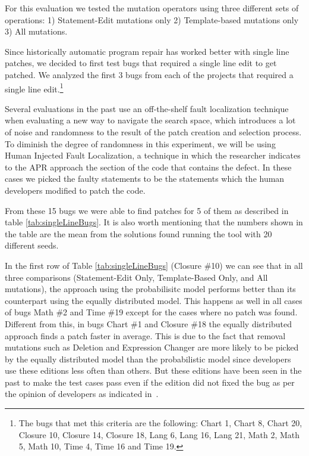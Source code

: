 \documentclass[conference]{IEEEtran}
\begin{document}
For this evaluation we tested the mutation operators using three different sets 
of operations: 1) Statement-Edit mutations only 2) Template-based mutations 
only 3) All mutations.

Since historically automatic program repair has worked better with single line 
patches, we decided to first test bugs that required a single line edit to get 
patched. We analyzed the first 3 bugs from each of the projects that required a 
single line edit.\footnote{The bugs that met this criteria are the following: Chart 1, 
Chart 8, Chart 20, Closure 10, Closure 14, Closure 18, Lang 6, Lang 16, Lang 21, 
Math 2, Math 5, Math 10, Time 4, Time 16 and Time 19.}

Several evaluations in the past use an off-the-shelf fault localization technique when evaluating a new way to navigate the search space, which introduces a lot of noise and randomness to the result of the patch creation and selection process. To diminish the degree of randomness in this experiment, we will be using Human Injected Fault Localization, a technique in which the researcher indicates to the APR approach the section of the code that contains the defect. In these cases we picked the faulty statements to be the statements which the human developers modified to patch the code.

From these 15 bugs we were able to find patches for 5 of them as described in table \ref{tab:singleLineBugs}. It is also worth mentioning that the numbers shown in the table are the mean from the solutions found running the tool with 20 different seeds. 

In the first row of Table \ref{tab:singleLineBugs} (Closure \#10) we can see that in all three comparisons (Statement-Edit Only, Template-Based Only, and All mutations), the approach using the probabilisitc model performs better than its counterpart using the equally distributed model. This happens as well in all cases of bugs Math \#2 and Time \#19 except for the cases where no patch was found. Different from this, in bugs Chart \#1 and Closure \#18 the equally distributed approach finds a patch faster in average. This is due to the fact that removal mutations such as Deletion and Expression Changer are more likely to be picked by the equally distributed model than the probabilistic model since developers use these editions less often than others. But these editions have been seen in the past to make the test cases pass even if the edition did not fixed the bug as per the opinion of developers as indicated in~\cite{kim2013}.
\end{document}
